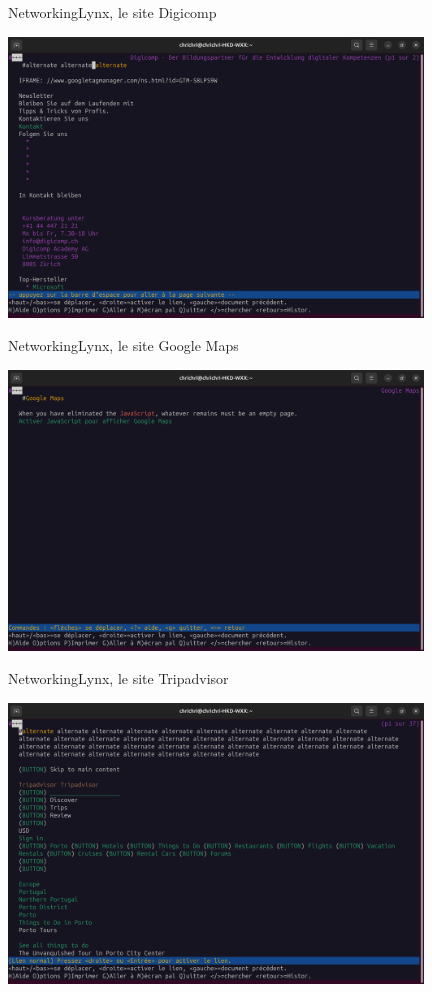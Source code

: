 \documentclass{beamer}
\begin{document}
    \begin{frame}[fragile]{Networking}{Lynx, le site Digicomp}
        \begin{center}
            \includegraphics[width=11cm]{image/lynx-digicomp}
        \end{center}
    \end{frame}

    \begin{frame}[fragile]{Networking}{Lynx, le site Google Maps}
        \begin{center}
            \includegraphics[width=11cm]{image/lynx-gmaps}
        \end{center}
    \end{frame}

    \begin{frame}[fragile]{Networking}{Lynx, le site Tripadvisor}
        \begin{center}
            \includegraphics[width=11cm]{image/lynx-tripadvisor}
        \end{center}
    \end{frame}
\end{document}
